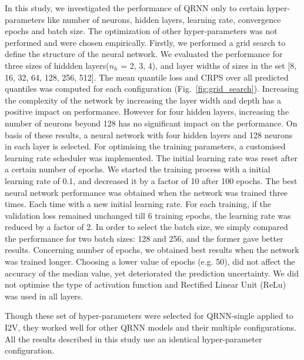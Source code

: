 \documentclass[amt, manuscript]{copernicus}
\begin{document}
In this study, we investigated the performance of QRNN only to certain hyper-parameters like number of neurons, hidden layers, learning rate, convergence epochs and batch size. The optimization of other hyper-parameters was not performed and were chosen empirically. Firstly, we performed a grid search to define the structure of the neural network. We evaluated the performance for three sizes of hiddden layers($n_h$ = 2, 3, 4), and layer widths of sizes in the set [8, 16, 32, 64, 128, 256, 512]. The mean quantile loss and CRPS over all predicted quantiles was computed for each configuration (Fig.~\ref{fig:grid_search}). Increasing the complexity of the network by increasing the layer width and depth has a positive impact on performance. However for four hidden layers, increasing the number of neurons beyond 128 has no significant impact on the performance. On basis of these results, a neural network with four hidden layers and 128 neurons in each layer is selected. For optimising the training parameters, a customised  learning rate scheduler was implemented. The initial learning rate was reset after a certain number of epochs.  We started the training process with a initial learning rate of 0.1, and decreased it by a factor of 10 after 100 epochs. The best neural network performance was obtained when the network was trained three times. Each time with a new initial learning rate. For each training, if the validation loss remained unchanged till 6 training epochs, the learning rate was reduced by a factor of 2. 
In order to select the batch size, we simply compared the performance for two batch sizes: 128 and 256, and the former gave better results. Concerning number of epochs, we obtained best results when the network was trained longer. Choosing a lower value of epochs (e.g. 50), did not affect the accuracy of the median value, yet deteriorated the prediction uncertainty. We did not optimise the type of activation function and Rectified Linear Unit (ReLu) was used in all layers. 

Though these set of hyper-parameters were selected for QRNN-single applied to I2V, they worked well for other QRNN models and their multiple configurations. All the results described in this study use an identical hyper-parameter configuration.



\noappendix       %
\end{document}
